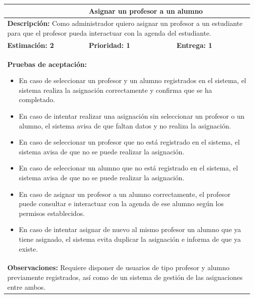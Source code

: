 \begin{table}[H]
\centering
{}
\begin{tabularx}{\textwidth}{|X|X|X|}
\hline
\rowcolor{azulclaro}
\multicolumn{1}{|l|}{\textbf{Identificador:} HU-A5} & \multicolumn{2}{l|}{\textbf{Asignar un profesor a un alumno}} \\ \hline
\multicolumn{3}{|p{\dimexpr\textwidth-2\tabcolsep-2\arrayrulewidth}|}{\textbf{Descripción:} Como administrador quiero asignar un profesor a un estudiante para que el profesor pueda interactuar con la agenda del estudiante.} \\ \hline
\rowcolor{white}
\textbf{Estimación: 2} & \textbf{Prioridad: 1} & \textbf{Entrega: 1} \\ \hline
\multicolumn{3}{|p{\dimexpr\textwidth-2\tabcolsep-2\arrayrulewidth}|}{%
\textbf{Pruebas de aceptación:}
\begin{itemize}[leftmargin=1.5em, itemsep=2pt, topsep=3pt]
    \item En caso de seleccionar un profesor y un alumno registrados en el sistema, el sistema realiza la asignación correctamente y confirma que se ha completado.
    \item En caso de intentar realizar una asignación sin seleccionar un profesor o un alumno, el sistema avisa de que faltan datos y no realiza la asignación.
    \item En caso de seleccionar un profesor que no está registrado en el sistema, el sistema avisa de que no se puede realizar la asignación.
    \item En caso de seleccionar un alumno que no está registrado en el sistema, el sistema avisa de que no se puede realizar la asignación.
    \item En caso de asignar un profesor a un alumno correctamente, el profesor puede consultar e interactuar con la agenda de ese alumno según los permisos establecidos.
    \item En caso de intentar asignar de nuevo al mismo profesor un alumno que ya tiene asignado, el sistema evita duplicar la asignación e informa de que ya existe.
\end{itemize}
} \\ \hline
\multicolumn{3}{|p{\dimexpr\textwidth-2\tabcolsep-2\arrayrulewidth}|}{\textbf{Observaciones:} Requiere disponer de usuarios de tipo profesor y alumno previamente registrados, así como de un sistema de gestión de las asignaciones entre ambos.~} \\ \hline
\end{tabularx}
\end{table}